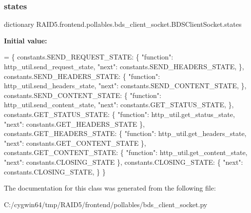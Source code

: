 \subsubsection{\texorpdfstring{states}{states}}
{\footnotesize\ttfamily dictionary R\+A\+I\+D5.\+frontend.\+pollables.\+bds\+\_\+client\+\_\+socket.\+B\+D\+S\+Client\+Socket.\+states\hspace{0.3cm}{\ttfamily [static]}}

{\bfseries Initial value\+:}
\begin{DoxyCode}
=  \{
        constants.SEND\_REQUEST\_STATE: \{
            \textcolor{stringliteral}{"function"}: http\_util.send\_request\_state,
            \textcolor{stringliteral}{"next"}: constants.SEND\_HEADERS\_STATE,
        \},
        constants.SEND\_HEADERS\_STATE: \{
            \textcolor{stringliteral}{"function"}: http\_util.send\_headers\_state,
            \textcolor{stringliteral}{"next"}: constants.SEND\_CONTENT\_STATE,
        \},
        constants.SEND\_CONTENT\_STATE: \{
            \textcolor{stringliteral}{"function"}: http\_util.send\_content\_state,
            \textcolor{stringliteral}{"next"}: constants.GET\_STATUS\_STATE,
        \},
        constants.GET\_STATUS\_STATE: \{
            \textcolor{stringliteral}{"function"}: http\_util.get\_status\_state,
            \textcolor{stringliteral}{"next"}: constants.GET\_HEADERS\_STATE
        \},
        constants.GET\_HEADERS\_STATE: \{
            \textcolor{stringliteral}{"function"}: http\_util.get\_headers\_state,
            \textcolor{stringliteral}{"next"}: constants.GET\_CONTENT\_STATE
        \},
        constants.GET\_CONTENT\_STATE: \{
            \textcolor{stringliteral}{"function"}: http\_util.get\_content\_state,
            \textcolor{stringliteral}{"next"}: constants.CLOSING\_STATE
        \},
        constants.CLOSING\_STATE: \{
            \textcolor{stringliteral}{"next"}: constants.CLOSING\_STATE,
        \}
    \}
\end{DoxyCode}


The documentation for this class was generated from the following file\+:\begin{DoxyCompactItemize}
\item 
C\+:/cygwin64/tmp/\+R\+A\+I\+D5/frontend/pollables/bds\+\_\+client\+\_\+socket.\+py\end{DoxyCompactItemize}
